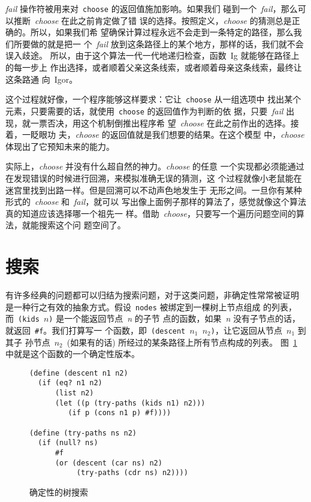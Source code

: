 \emph{fail} 操作符被用来对~\texttt{choose} 的返回值施加影响。如果我们
碰到一个~\emph{fail}，那么可以推断~\emph{choose} 在此之前肯定做了错
误的选择。按照定义，\emph{choose} 的猜测总是正确的。所以，如果我们希
望确保计算过程永远不会走到一条特定的路径，那么我们所要做的就是把一
个~\emph{fail} 放到这条路径上的某个地方，那样的话，我们就不会误入歧途。
所以，由于这个算法一代一代地递归检查，函数~Ig 就能够在路径上的每一步上
作出选择，或者顺着父亲这条线索，或者顺着母亲这条线索，最终让这条路通
向~Igor。

这个过程就好像，一个程序能够这样要求：它让~\texttt{choose} 从一组选项中
找出某个元素，只要需要的话，就使用~\texttt{choose} 的返回值作为判断的依
据，只要~\emph{fail} 出现，就一票否决，用这个机制倒推出程序希
望~\emph{choose} 在此之前作出的选择。接着，一眨眼功
夫，\emph{choose} 的返回值就是我们想要的结果。在这个模型
中，\emph{choose} 体现出了它预知未来的能力。

实际上，\emph{choose} 并没有什么超自然的神力。\emph{choose} 的任意
一个实现都必须能通过在发现错误的时候进行回溯，来模拟准确无误的猜测，这
个过程就像小老鼠能在迷宫里找到出路一样。但是回溯可以不动声色地发生于
无形之间。一旦你有某种形式的~\emph{choose} 和~\emph{fail}，就可以
写出像上面例子那样的算法了，感觉就像这个算法真的知道应该选择哪一个祖先一
样。借助~\emph{choose}，只要写一个遍历问题空间的算法，就能搜索这个问
题空间了。

\section{搜索}
\label{sec:nondeterminism:search}

有许多经典的问题都可以归结为搜索问题，对于这类问题，非确定性常常被证明
是一种行之有效的抽象方式。假设~\verb|nodes| 被绑定到一棵树上节点组成
的列表，而~\texttt{(kids $n$)} 是一个能返回节点~\emph{n} 的子节
点的函数，如果~\emph{n} 没有子节点的话，就返回~\texttt{\#f}。我们打算写一
个函数，即~\texttt{(descent $n_1$ $n_2$)}，让它返回从节点~$n_1$ 到其子
孙节点~$n_2$~(如果有的话) 所经过的某条路径上所有节点构成的列表。
图~\ref{fig:deterministic_tree_search} 中就是这个函数的一个确定性版本。
\begin{figure}
\begin{lstlisting}
(define (descent n1 n2)
  (if (eq? n1 n2)
      (list n2)
      (let ((p (try-paths (kids n1) n2)))
         (if p (cons n1 p) #f))))

(define (try-paths ns n2)
  (if (null? ns)
      #f
      (or (descent (car ns) n2)
           (try-paths (cdr ns) n2))))
\end{lstlisting}
\caption{确定性的树搜索}
\label{fig:deterministic_tree_search}
\end{figure}

